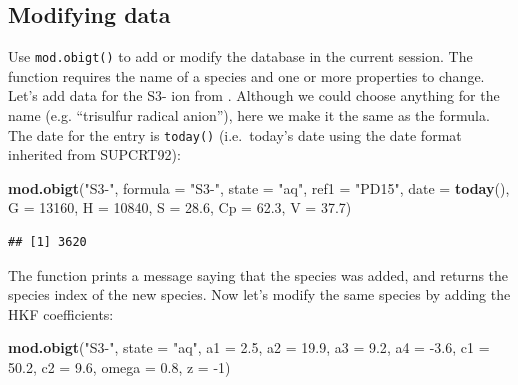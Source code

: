 \documentclass[]{tufte-handout}
\newenvironment{Shaded}{}{}
\newcommand{\KeywordTok}[1]{\textcolor[rgb]{0.00,0.44,0.13}{\textbf{#1}}}
\newcommand{\DataTypeTok}[1]{\textcolor[rgb]{0.56,0.13,0.00}{#1}}
\newcommand{\DecValTok}[1]{\textcolor[rgb]{0.25,0.63,0.44}{#1}}
\newcommand{\FloatTok}[1]{\textcolor[rgb]{0.25,0.63,0.44}{#1}}
\newcommand{\StringTok}[1]{\textcolor[rgb]{0.25,0.44,0.63}{#1}}
\newcommand{\OperatorTok}[1]{\textcolor[rgb]{0.40,0.40,0.40}{#1}}
\newcommand{\NormalTok}[1]{#1}
\begin{document}
\subsection{Modifying data}\label{modifying-data}

Use {\texttt{mod.obigt()}} to add or modify the database in the current
session. The function requires the name of a species and one or more
properties to change. Let's add data for the S3- ion from \citet{PD15}.
Although we could choose anything for the name (e.g. ``trisulfur radical
anion''), here we make it the same as the formula. The date for the
entry is {\texttt{today()}} (i.e.~today's date using the date format
inherited from SUPCRT92):

\begin{Shaded}
\begin{Highlighting}[]
\KeywordTok{mod.obigt}\NormalTok{(}\StringTok{"S3-"}\NormalTok{, }\DataTypeTok{formula =} \StringTok{"S3-"}\NormalTok{, }\DataTypeTok{state =} \StringTok{"aq"}\NormalTok{, }\DataTypeTok{ref1 =} \StringTok{"PD15"}\NormalTok{, }\DataTypeTok{date =} \KeywordTok{today}\NormalTok{(),}
          \DataTypeTok{G =} \DecValTok{13160}\NormalTok{, }\DataTypeTok{H =} \DecValTok{10840}\NormalTok{, }\DataTypeTok{S =} \FloatTok{28.6}\NormalTok{, }\DataTypeTok{Cp =} \FloatTok{62.3}\NormalTok{, }\DataTypeTok{V =} \FloatTok{37.7}\NormalTok{)}
\end{Highlighting}
\end{Shaded}

\begin{verbatim}
## [1] 3620
\end{verbatim}

The function prints a message saying that the species was added, and
returns the species index of the new species. Now let's modify the same
species by adding the HKF coefficients:

\begin{Shaded}
\begin{Highlighting}[]
\KeywordTok{mod.obigt}\NormalTok{(}\StringTok{"S3-"}\NormalTok{, }\DataTypeTok{state =} \StringTok{"aq"}\NormalTok{, }\DataTypeTok{a1 =} \FloatTok{2.5}\NormalTok{, }\DataTypeTok{a2 =} \FloatTok{19.9}\NormalTok{, }\DataTypeTok{a3 =} \FloatTok{9.2}\NormalTok{, }\DataTypeTok{a4 =} \OperatorTok{-}\FloatTok{3.6}\NormalTok{,}
          \DataTypeTok{c1 =} \FloatTok{50.2}\NormalTok{, }\DataTypeTok{c2 =} \FloatTok{9.6}\NormalTok{, }\DataTypeTok{omega =} \FloatTok{0.8}\NormalTok{, }\DataTypeTok{z =} \OperatorTok{-}\DecValTok{1}\NormalTok{)}
\end{Highlighting}
\end{Shaded}
\end{document}

